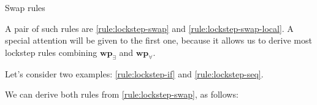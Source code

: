 \begin{mathfig}{\small}
    \begin{proofrules}        
        
        \label{rule:lockstep-swap}

        
        \label{rule:lockstep-swap-local}
    \end{proofrules}
    \caption{Swap rules}
\end{mathfig}

A pair of such rules are \cref{rule:lockstep-swap} and \cref{rule:lockstep-swap-local}. A special attention will be given to the first one, because it allows us to derive most lockstep rules combining $\mathbf{wp}_{\exists}$ and $\mathbf{wp}_{\forall}$.

Let's consider two examples: \cref{rule:lockstep-if} and \cref{rule:lockstep-seq}.

\resizebox{0.8\width}{!}{
\begin{proofrules}
    
    \label{rule:lockstep-seq}

    
    \label{rule:lockstep-if}
\end{proofrules}
}

\bigskip

We can derive both rules from \cref{rule:lockstep-swap}, as follows:

\bigskip

\begin{prooftree}
\end{prooftree}

\bigskip

